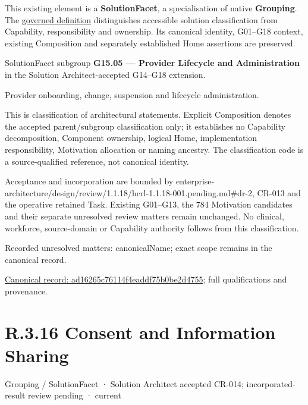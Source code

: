 This existing element is a \textbf{SolutionFacet}, a specialisation of native
\textbf{Grouping}. The \href{\detokenize{../../../../../../../governance/continuum-representation.md#solutionfacet-classification--1119-candidate}}{governed definition}
distinguishes accessible solution classification from Capability, responsibility
and ownership. Its canonical identity, G01–G18 context, existing Composition
and separately established Home assertions are preserved.



SolutionFacet subgroup \textbf{G15.05 — Provider Lifecycle and Administration} in the Solution Architect-accepted G14–G18 extension.



Provider onboarding, change, suspension and lifecycle administration.



This is classification of architectural statements. Explicit Composition denotes the accepted parent/subgroup classification only; it establishes no Capability decomposition, Component ownership, logical Home, implementation responsibility, Motivation allocation or naming ancestry. The classification code is a source-qualified reference, not canonical identity.



Acceptance and incorporation are bounded by enterprise-architecture/design/review/1.1.18/hcrl-1.1.18-001.pending.md\#dr-2, CR-013 and the operative retained Task. Existing G01–G13, the 784 Motivation candidates and their separate unresolved review matters remain unchanged. No clinical, workforce, source-domain or Capability authority follows from this classification.


{\small Recorded unresolved matters: canonicalName; exact scope remains in the canonical record.}\par
{\footnotesize \href{../../../../../../../continuum/grouping/ad16265c76114f4eaddf75b0be2d4755.md}{Canonical record: ad16265c76114f4eaddf75b0be2d4755}; full qualifications and provenance.}\par
\section*{R.3.16 Consent and Information Sharing}
\label{navigation:R.3.16}

\label{element:abca473311ea40aca58756d859077ff7}
{\small Grouping / SolutionFacet · Solution Architect accepted CR-014; incorporated-result review pending · current}\par

